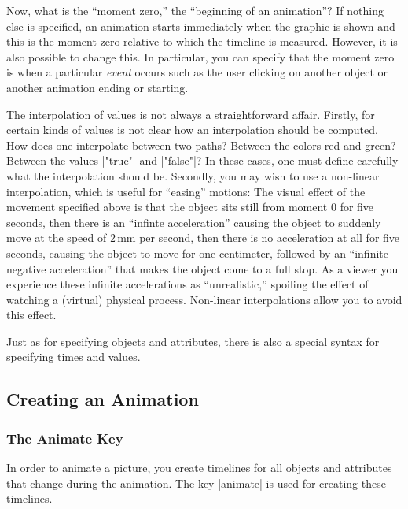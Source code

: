 Now, what is the ``moment zero,'' the ``beginning of an animation''? If
nothing else is specified, an animation starts immediately when the
graphic is shown and this is the moment zero relative to which the
timeline is measured. However, it is also possible to change this. In
particular, you can specify that the moment zero is when a particular
\emph{event} occurs such as the user clicking on another object or
another animation ending or starting.

The interpolation of values is not always a straightforward affair.
Firstly, for certain kinds of values is not clear how an interpolation
should be computed. How does one interpolate between two paths?
Between the colors red and green? Between the values |"true"| and
|"false"|? In these cases, one must define carefully what the
interpolation should be. Secondly, you may wish to use a non-linear
interpolation, which is useful for ``easing'' motions: The visual
effect of the movement 
specified above is that the object sits still from moment $0$ for five
seconds, then there is an ``infinte acceleration'' causing the object
to suddenly move at the speed of 2\,mm per second, then there is no
acceleration at all for five seconds, causing the object to move for
one centimeter, followed by an ``infinite negative acceleration'' that
makes the object come to a full stop. As a viewer you experience these
infinite accelerations as ``unrealistic,'' spoiling the effect of
watching a (virtual) physical process. Non-linear interpolations allow
you to avoid this effect. 

Just as for specifying objects and attributes, there is also a special
syntax for specifying times and values.



\subsection{Creating an Animation}

\subsubsection{The Animate Key}

In order to animate a picture, you create timelines for all objects
and attributes that change during the animation. The key |animate| is
used for creating these timelines.

